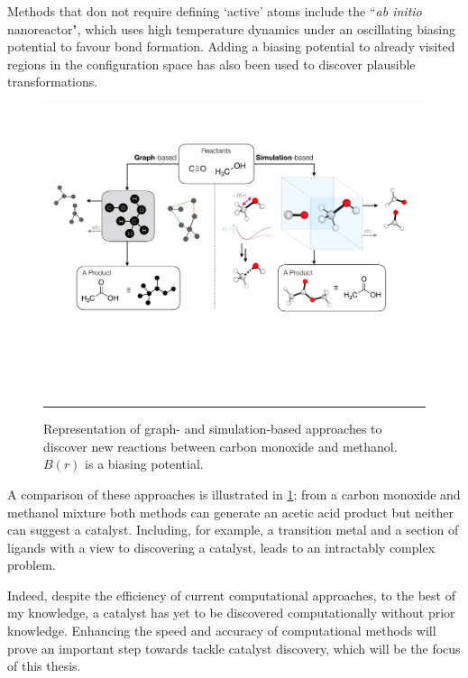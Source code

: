\documentclass[../main.tex]{subfiles}
\begin{document}
Methods that don not require defining `active' atoms include the ``\emph{ab initio} nanoreactor"\cite{Wang2014}, which uses high temperature dynamics under an oscillating biasing potential to favour bond formation. Adding a biasing potential to already visited regions in the configuration space has also been used to discover plausible transformations.\cite{Grimme2019} 


\begin{figure}[t!]
	\centering
	\vspace{0.4cm}
	\includegraphics[width=14cm]{1/figs/fig2/fig2.pdf}
	\vspace{0.4cm}
	\hrule
	\caption{Representation of graph- and simulation-based approaches to discover new reactions between carbon monoxide and methanol. $B(r)$ is a biasing potential.}
	\label{fig::intro_X3}
\end{figure}

A comparison of these approaches is illustrated in \figurename{ \ref{fig::intro_X3}}; from a carbon monoxide and methanol mixture both methods can generate an acetic acid product but neither can suggest a catalyst. Including, for example, a transition metal and a section of ligands with a view to discovering a catalyst, leads to an intractably complex problem. 

Indeed, despite the efficiency of current computational approaches, to the best of my knowledge, a catalyst has yet to be discovered computationally without prior knowledge. Enhancing the speed and accuracy of computational methods will prove an important step towards tackle catalyst discovery, which will be the focus of this thesis.
\end{document}
